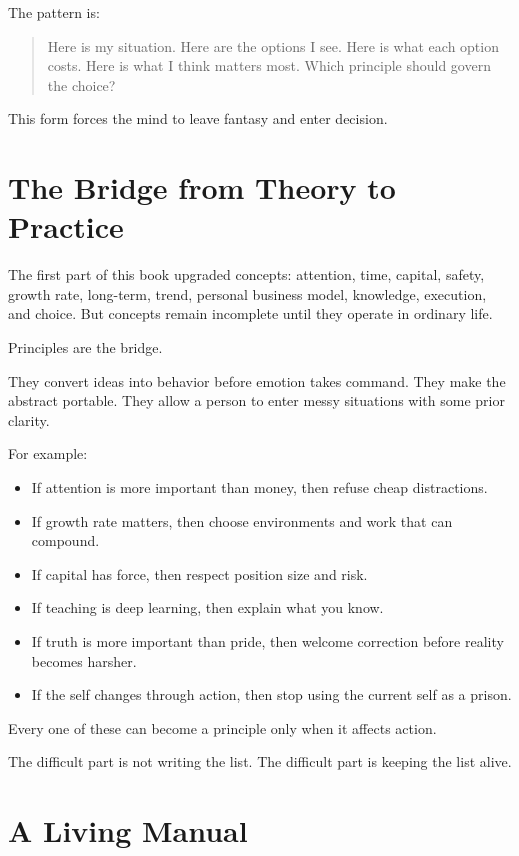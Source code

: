 The pattern is:

\begin{quote}
Here is my situation. Here are the options I see. Here is what each option costs. Here is what I think matters most. Which principle should govern the choice?
\end{quote}

This form forces the mind to leave fantasy and enter decision.

\section*{The Bridge from Theory to Practice}

The first part of this book upgraded concepts: attention, time, capital, safety, growth rate, long-term, trend, personal business model, knowledge, execution, and choice. But concepts remain incomplete until they operate in ordinary life.

Principles are the bridge.

They convert ideas into behavior before emotion takes command. They make the abstract portable. They allow a person to enter messy situations with some prior clarity.

For example:

\begin{itemize}
\item If attention is more important than money, then refuse cheap distractions.
\item If growth rate matters, then choose environments and work that can compound.
\item If capital has force, then respect position size and risk.
\item If teaching is deep learning, then explain what you know.
\item If truth is more important than pride, then welcome correction before reality becomes harsher.
\item If the self changes through action, then stop using the current self as a prison.
\end{itemize}

Every one of these can become a principle only when it affects action.

The difficult part is not writing the list. The difficult part is keeping the list alive.

\section*{A Living Manual}

